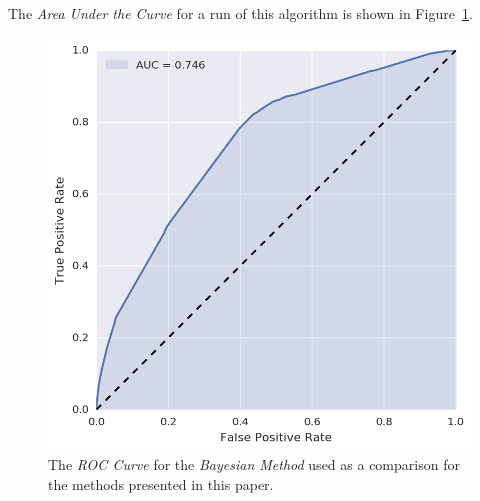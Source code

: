 The \emph{Area Under the Curve} for a run of this algorithm is shown in Figure~\ref{fig:bayesian_roc}.

\begin{figure}
\centering
\includegraphics[height=.24\textheight]{figures/bayesian_roc.png}
\caption{The \emph{ROC Curve} for the \emph{Bayesian Method} used as a comparison for the methods presented in this paper.}
\label{fig:bayesian_roc}
\end{figure}

